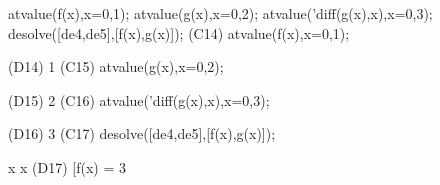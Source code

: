 \documentclass{article}
\begin{document}
\beginmaximasession
atvalue(f(x),x=0,1);
atvalue(g(x),x=0,2);
atvalue('diff(g(x),x),x=0,3);
desolve([de4,de5],[f(x),g(x)]);
\maximasession
(C14) atvalue(f(x),x=0,1);


(D14)                                  1
(C15) atvalue(g(x),x=0,2);


(D15)                                  2
(C16) atvalue('diff(g(x),x),x=0,3);


(D16)                                  3
(C17) desolve([de4,de5],[f(x),g(x)]);


                             x                          x
(D17)            [f(x) = 3 %
\endmaximasession
\end{document}
